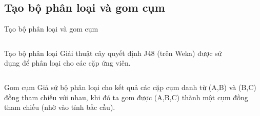 \documentclass[9pt,xcolor=table,hyperref=unicode]{beamer}
\begin{document}
	\subsection{Tạo bộ phân loại và gom cụm}
	\begin{frame}{Tạo bộ phân loại và gom cụm}		
		\begin{columns}[t]
			\begin{column}{0.4\textwidth}
			   	\begin{block}{Tạo bộ phân loại}
					Giải thuật cây quyết định J48 (trên Weka) được sử dụng để phân loại cho các cặp ứng viên.
				\end{block}				
			\end{column}
			\begin{column}{0.6\textwidth}  %
			 	\begin{figure}[H]
					\LARGE 
					\centering				
					\resizebox{65mm}{!}{}	
				\end{figure}
			\end{column}
		\end{columns}
		\begin{columns}[t]
			\begin{column}{\textwidth}
			   	\begin{block}{Gom cụm}
			   		Giả sử bộ phân loại cho kết quả các cặp cụm danh từ (A,B) và (B,C) đồng tham chiếu với nhau, khi đó ta gom được (A,B,C) thành một cụm đồng tham chiếu (nhờ vào tính bắc cầu).			
				\end{block}					
			\end{column}			
		\end{columns}
	\end{frame}
\end{document}
